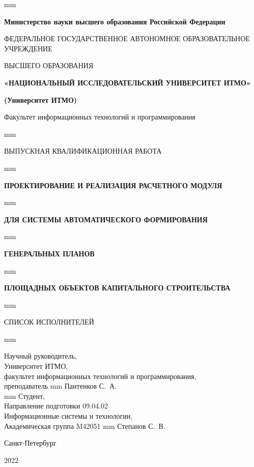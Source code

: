 \thispagestyle{empty}
 mm
\centerline{\footnotesize{\textbf{Министерство науки высшего образования Российской Федерации}}}
\centerline{\footnotesize{ФЕДЕРАЛЬНОЕ ГОСУДАРСТВЕННОЕ АВТОНОМНОЕ ОБРАЗОВАТЕЛЬНОЕ УЧРЕЖДЕНИЕ}}
\centerline{\small{ВЫСШЕГО ОБРАЗОВАНИЯ}}
\centerline{\textbf{«НАЦИОНАЛЬНЫЙ ИССЛЕДОВАТЕЛЬСКИЙ УНИВЕРСИТЕТ ИТМО»}}
\centerline{\textbf{(Университет ИТМО)}}
\centerline{Факультет информационных технологий и программирования}

 mm
\centerline{\LARGE{ВЫПУСКНАЯ КВАЛИФИКАЦИОННАЯ РАБОТА}}
 mm

\centerline{\large\textbf{ПРОЕКТИРОВАНИЕ И РЕАЛИЗАЦИЯ РАСЧЕТНОГО МОДУЛЯ}}
 mm
\centerline{\large\textbf{ДЛЯ СИСТЕМЫ АВТОМАТИЧЕСКОГО ФОРМИРОВАНИЯ}}
 mm
\centerline{\large\textbf{ГЕНЕРАЛЬНЫХ ПЛАНОВ}}
 mm
\centerline{\large\textbf{ПЛОЩАДНЫХ ОБЪЕКТОВ КАПИТАЛЬНОГО СТРОИТЕЛЬСТВА}}
 mm
\centerline{\large{СПИСОК ИСПОЛНИТЕЛЕЙ}}
 mm
\large{
\noindent
Научный руководитель, \\
Университет ИТМО, \\
факультет информационных технологий и программирования, \\
преподаватель  mm Пантенков С.~А.\\
 mm \noindent
Студент, \\
Направление подготовки 09.04.02 \\
Информационные системы и технологии, \\
Академическая группа M42051  mm Степанов С.~В.\\
\vfill \hfil \break
\centerline{\large Санкт-Петербург } \centerline{ 2022 }
}

